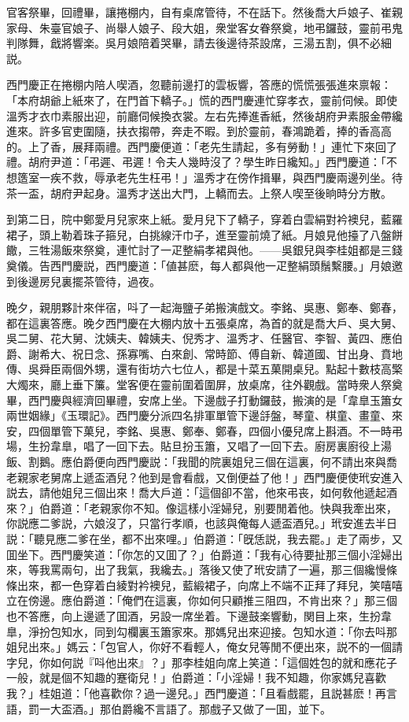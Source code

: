 官客祭畢，回禮畢，讓捲棚内，自有桌席管待，不在話下。然後喬大戶娘子、崔親家母、朱臺官娘子、尚舉人娘子、段大姐，衆堂客女眷祭奠，地弔鑼鼓，靈前弔鬼判隊舞，戧將響楽。吳月娘陪着哭畢，請去後邊待茶設席，三湯五割，俱不必細説。

西門慶正在捲棚内陪人喫酒，忽聽前邊打的雲板響，答應的慌慌張張進來禀報：「本府胡爺上紙來了，在門首下轎子。」慌的西門慶連忙穿孝衣，靈前伺候。即使溫秀才衣巾素服出迎，前廳伺候換衣裳。左右先捧進香紙，然後胡府尹素服金帶纔進來。許多官吏圍隨，扶衣搊帶，奔走不暇。到於靈前，春鴻跪着，捧的香高高的。上了香，展拜兩禮。西門慶便道：「老先生請起，多有勞動！」連忙下來回了禮。胡府尹道：「弔遲、弔遲！令夫人幾時沒了？學生昨日纔知。」西門慶道：「不想簉室一疾不救，辱承老先生枉弔！」溫秀才在傍作揖畢，與西門慶兩邊列坐。待茶一盃，胡府尹起身。溫秀才送出大門，上轎而去。上祭人喫至後晌時分方散。

到第二日，院中鄭愛月兒家來上紙。愛月兒下了轎子，穿着白雲絹對衿襖兒，藍羅裙子，頭上勒着珠子箍兒，白挑線汗巾子，進至靈前燒了紙。月娘見他擡了八盤餅饊，三牲湯飯來祭奠，連忙討了一疋整絹孝裙與他。——吳銀兒與李桂姐都是三錢奠儀。告西門慶説，西門慶道：「値甚麽，每人都與他一疋整絹頭鬚繫腰。」月娘邀到後邊房兒裏擺茶管待，過夜。

晚夕，親朋夥計來伴宿，呌了一起海鹽子弟搬演戲文。李銘、吳惠、鄭奉、鄭春，都在這裏答應。晚夕西門慶在大棚内放十五張桌席，為首的就是喬大戶、吳大舅、吳二舅、花大舅、沈姨夫、韓姨夫、倪秀才、溫秀才、任醫官、李智、黃四、應伯爵、謝希大、祝日念、孫寡嘴、白來創、常時節、傅自新、韓道國、甘出身、賁地傳、吳舜臣兩個外甥，還有街坊六七位人，都是十菜五菓開桌兒。點起十數枝高檠大燭來，廳上垂下簾。堂客便在靈前圍着圍屏，放桌席，往外觀戲。當時衆人祭奠畢，西門慶與經濟回畢禮，安席上坐。下邊戲子打動鑼鼓，搬演的是「韋臯玉簫女兩世姻緣」《玉環記》。西門慶分派四名排軍單管下邊㧱盤，琴童、棋童、畫童、來安，四個單管下菓兒，李銘、吳惠、鄭奉、鄭春，四個小優兒席上斟酒。不一時弔場，生扮韋臯，唱了一回下去。貼旦扮玉簫，又唱了一回下去。廚房裏廚役上湯飯、割鵝。應伯爵便向西門慶説：「我聞的院裏姐兒三個在這裏，何不請出來與喬老親家老舅席上遞盃酒兒？他到是會看戲，又倒便益了他！」西門慶便使玳安進入説去，請他姐兒三個出來！喬大戶道：「這個卻不當，他來弔丧，如何敎他遞起酒來？」伯爵道：「老親家你不知。像這樣小淫婦兒，别要閒着他。快與我牽出來，你説應二爹説，六娘沒了，只當行孝順，也該與俺每人遞盃酒兒。」玳安進去半日説：「聽見應二爹在坐，都不出來哩。」伯爵道：「旣恁説，我去罷。」走了兩步，又囬坐下。西門慶笑道：「你怎的又囬了？」伯爵道：「我有心待要扯那三個小淫婦出來，等我罵兩句，出了我氣，我纔去。」落後又使了玳安請了一遍，那三個纔慢條條出來，都一色穿着白綾對衿襖兒，藍緞裙子，向席上不端不正拜了拜兒，笑嘻嘻立在傍邊。應伯爵道：「俺們在這裏，你如何只顧推三阻四，不肯出來？」那三個也不答應，向上邊遞了囬酒，另設一席坐着。下邊鼓楽響動，関目上來，生扮韋臯，淨扮包知水，同到勾欄裏玉簫家來。那媽兒出來迎接。包知水道：「你去呌那姐兒出來。」媽云：「包官人，你好不看輕人，俺女兒等閒不便出來，説不的一個請字兒，你如何説『呌他出來』？」那李桂姐向席上笑道：「這個姓包的就和應花子一般，就是個不知趣的蹇衛兒！」伯爵道：「小淫婦！我不知趣，你家媽兒喜歡我？」桂姐道：「他喜歡你？過一邊兒。」西門慶道：「且看戲罷，且説甚麽！再言語，罰一大盃酒。」那伯爵纔不言語了。那戲子又做了一囬，並下。

